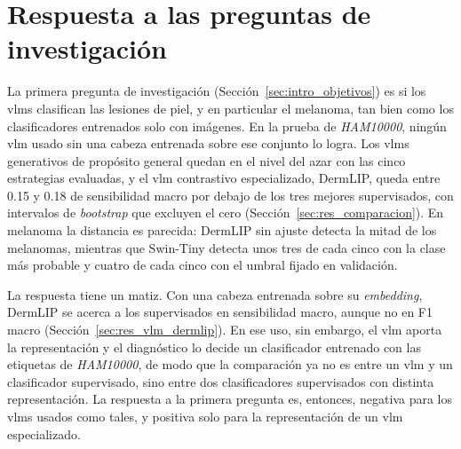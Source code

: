 \section{Respuesta a las preguntas de investigación}
\label{sec:disc_preguntas}

La primera pregunta de investigación (Sección~\ref{sec:intro_objetivos}) es si los \glspl{vlm} clasifican las
lesiones de piel, y en particular el melanoma, tan bien como los clasificadores entrenados solo con imágenes. En la
prueba de \emph{HAM10000}, ningún \gls{vlm} usado sin una cabeza entrenada sobre ese conjunto lo logra. Los
\glspl{vlm} generativos de propósito general quedan en el nivel del azar con las cinco estrategias evaluadas, y el
\gls{vlm} contrastivo especializado, DermLIP, queda entre 0.15 y 0.18 de sensibilidad macro por debajo de los tres
mejores supervisados, con intervalos de \emph{bootstrap} que excluyen el cero (Sección~\ref{sec:res_comparacion}). En
melanoma la distancia es parecida: DermLIP sin ajuste detecta la mitad de los melanomas, mientras que Swin-Tiny
detecta unos tres de cada cinco con la clase más probable y cuatro de cada cinco con el umbral fijado en validación.

La respuesta tiene un matiz. Con una cabeza entrenada sobre su \emph{embedding}, DermLIP se acerca a los supervisados
en sensibilidad macro, aunque no en F1 macro (Sección~\ref{sec:res_vlm_dermlip}). En ese uso, sin embargo, el
\gls{vlm} aporta la representación y el diagnóstico lo decide un clasificador entrenado con las etiquetas de
\emph{HAM10000}, de modo que la comparación ya no es entre un \gls{vlm} y un clasificador supervisado, sino entre dos
clasificadores supervisados con distinta representación. La respuesta a la primera pregunta es, entonces, negativa
para los \glspl{vlm} usados como tales, y positiva solo para la representación de un \gls{vlm} especializado.

